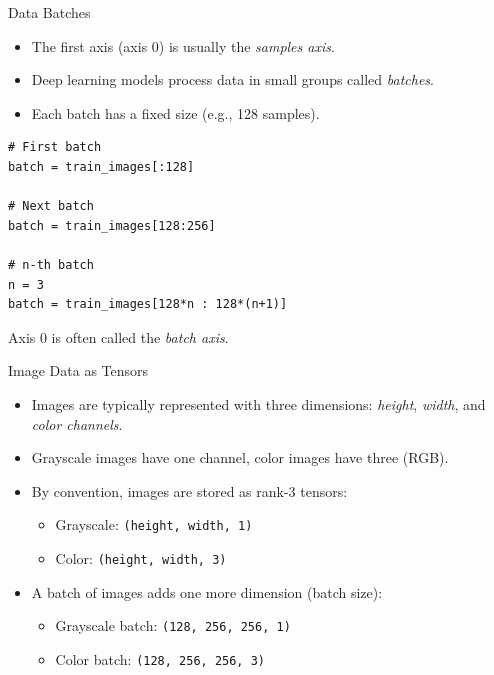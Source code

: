 \documentclass{beamer}
\begin{document}
\begin{frame}[fragile]{Data Batches}
    \begin{itemize}
        \item The first axis (axis 0) is usually the \textit{samples axis}.
        \item Deep learning models process data in small groups called \textit{batches}.
        \item Each batch has a fixed size (e.g., 128 samples).
    \end{itemize}

    \begin{center}
        \begin{tcolorbox}[
                width=0.75\textwidth,
                colback=gray!5,
                colframe=gray!60,
                boxrule=0.4pt,
                arc=3pt,
                left=6pt,right=6pt,top=6pt,bottom=6pt
            ]
            \begin{verbatim}
# First batch
batch = train_images[:128]

# Next batch
batch = train_images[128:256]

# n-th batch
n = 3
batch = train_images[128*n : 128*(n+1)]
\end{verbatim}
        \end{tcolorbox}
    \end{center}

    \vspace{0.5em}
    \small Axis 0 is often called the \textit{batch axis}.
\end{frame}

\begin{frame}{Image Data as Tensors}
    \begin{itemize}
        \item Images are typically represented with three dimensions:
              \textit{height}, \textit{width}, and \textit{color channels}.

        \item Grayscale images have one channel, color images have three (RGB).

        \item By convention, images are stored as rank-3 tensors:
              \begin{itemize}
                  \item Grayscale: \texttt{(height, width, 1)}
                  \item Color: \texttt{(height, width, 3)}
              \end{itemize}

        \item A batch of images adds one more dimension (batch size):
              \begin{itemize}
                  \item Grayscale batch: \texttt{(128, 256, 256, 1)}
                  \item Color batch: \texttt{(128, 256, 256, 3)}
              \end{itemize}
    \end{itemize}
\end{frame}
\end{document}

